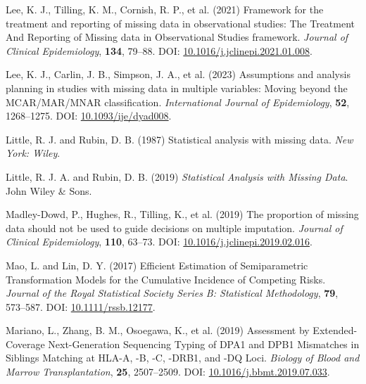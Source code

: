 \documentclass[
  letterpaper,
  DIV=11,
  numbers=noendperiod]{scrreprt}
\newlength{\cslhangindent}
\newlength{\cslentryspacingunit} %
\newenvironment{CSLReferences}[2] %
 {%
  \setlength{\parindent}{0pt}
  \ifodd #1
  \let\oldpar\par
  \def\par{\hangindent=\cslhangindent\oldpar}
  \fi
  \setlength{\parskip}{#2\cslentryspacingunit}
 }%
 {}
\begin{document}
\begin{CSLReferences}{1}{0}
\leavevmode{}%
Lee, K. J., Tilling, K. M., Cornish, R. P., et al. (2021) Framework for
the treatment and reporting of missing data in observational studies:
{The Treatment And Reporting} of {Missing} data in {Observational
Studies} framework. \emph{Journal of Clinical Epidemiology},
\textbf{134}, 79--88. DOI:
\href{https://doi.org/10.1016/j.jclinepi.2021.01.008}{10.1016/j.jclinepi.2021.01.008}.

\leavevmode{}%
Lee, K. J., Carlin, J. B., Simpson, J. A., et al. (2023) Assumptions and
analysis planning in studies with missing data in multiple variables:
Moving beyond the {MCAR}/{MAR}/{MNAR} classification.
\emph{International Journal of Epidemiology}, \textbf{52}, 1268--1275.
DOI: \href{https://doi.org/10.1093/ije/dyad008}{10.1093/ije/dyad008}.

\leavevmode{}%
Little, R. J. and Rubin, D. B. (1987) Statistical analysis with missing
data. \emph{New York: Wiley}.

\leavevmode{}%
Little, R. J. A. and Rubin, D. B. (2019) \emph{Statistical {Analysis}
with {Missing Data}}. John Wiley \& Sons.

\leavevmode{}%
Madley-Dowd, P., Hughes, R., Tilling, K., et al. (2019) The proportion
of missing data should not be used to guide decisions on multiple
imputation. \emph{Journal of Clinical Epidemiology}, \textbf{110},
63--73. DOI:
\href{https://doi.org/10.1016/j.jclinepi.2019.02.016}{10.1016/j.jclinepi.2019.02.016}.

\leavevmode{}%
Mao, L. and Lin, D. Y. (2017) Efficient {Estimation} of {Semiparametric
Transformation Models} for the {Cumulative Incidence} of {Competing
Risks}. \emph{Journal of the Royal Statistical Society Series B:
Statistical Methodology}, \textbf{79}, 573--587. DOI:
\href{https://doi.org/10.1111/rssb.12177}{10.1111/rssb.12177}.

\leavevmode{}%
Mariano, L., Zhang, B. M., Osoegawa, K., et al. (2019) Assessment by
{Extended-Coverage Next-Generation Sequencing Typing} of {DPA1} and
{DPB1 Mismatches} in {Siblings Matching} at {HLA-A}, -{B}, -{C},
-{DRB1}, and -{DQ Loci}. \emph{Biology of Blood and Marrow
Transplantation}, \textbf{25}, 2507--2509. DOI:
\href{https://doi.org/10.1016/j.bbmt.2019.07.033}{10.1016/j.bbmt.2019.07.033}.


\end{CSLReferences}
\end{document}
